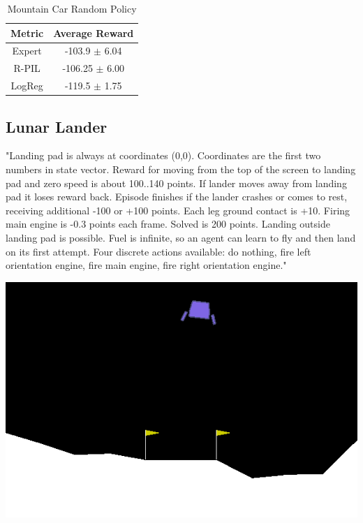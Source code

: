\documentclass[11pt]{article}
\begin{document}
\begin{table}[H]
\caption{Mountain Car Random Policy} %
\centering %
    \begin{tabular}{c c} %
        \hline\hline %
        Metric &  Average Reward \\ [0.5ex] %
        \hline %
         Expert &  -103.9 $\pm$ 6.04
         \\ %
        R-PIL & -106.25 $\pm$ 6.00   \\ %
       LogReg & -119.5 $\pm$ 1.75\\
        \hline %
    \end{tabular}
\label{MountainCarRandom} %
\end{table}

\subsection{Lunar Lander}


\quad "Landing pad is always at coordinates (0,0). Coordinates are the first two numbers in state vector. Reward for moving from the top of the screen to landing pad and zero speed is about 100..140 points. If lander moves away from landing pad it loses reward back. Episode finishes if the lander crashes or comes to rest, receiving additional -100 or +100 points. Each leg ground contact is +10. Firing main engine is -0.3 points each frame. Solved is 200 points. Landing outside landing pad is possible. Fuel is infinite, so an agent can learn to fly and then land on its first attempt. Four discrete actions available: do nothing, fire left orientation engine, fire main engine, fire right orientation engine." \cite{brockman2016openai}


\begin{center}
    \includegraphics[scale=0.5]{LunarLander.png}
\end{center}
    
\end{document}
